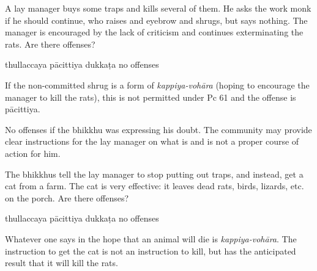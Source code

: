 \begin{exam}{\autoExamName}
\begin{problem*}
  \begin{parts}

    \item A lay manager buys some traps and kills several of them. He asks the work monk if he should continue, who raises and eyebrow and shrugs, but says nothing. The manager is encouraged by the lack of criticism and continues exterminating the rats. Are there offenses?

    \bigskip

    \begin{answers}{4}
      \bChoices
       thullaccaya \eAns
       pācittiya\eAns
       dukkaṭa\eAns
       no offenses\eAns
      \eChoices
    \end{answers}

    \begin{solution}
      If the non-committed shrug is a form of \emph{kappiya-vohāra} (hoping to encourage the manager to kill the rats), this is not permitted under Pc 61 and the offense is pācittiya.

      No offenses if the bhikkhu was expressing his doubt.
      The community may provide clear instructions for the lay manager on what is and is not a proper course of action for him.
    \end{solution}

    \bigskip

    \item The bhikkhus tell the lay manager to stop putting out traps, and instead, get a cat from a farm. The cat is very effective: it leaves dead rats, birds, lizards, etc. on the porch. Are there offenses?

    \bigskip

    \begin{answers}{4}
      \bChoices
       thullaccaya \eAns
       pācittiya\eAns
       dukkaṭa\eAns
       no offenses\eAns
      \eChoices
    \end{answers}

    \begin{solution}
      Whatever one says in the hope that an animal will die is \emph{kappiya-vohāra}.
      The instruction to get the cat is not an instruction to kill,
      but has the anticipated result that it will kill the rats.
    \end{solution}

  \end{parts}

\end{problem*}

\end{exam}

